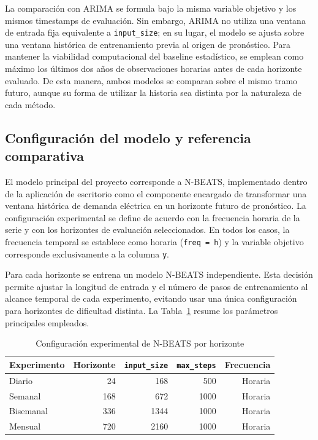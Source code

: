 La comparación con ARIMA se formula bajo la misma variable objetivo y los mismos timestamps de evaluación. Sin embargo, ARIMA no utiliza una ventana de entrada fija equivalente a \texttt{input\_size}; en su lugar, el modelo se ajusta sobre una ventana histórica de entrenamiento previa al origen de pronóstico. Para mantener la viabilidad computacional del baseline estadístico, se emplean como máximo los últimos dos años de observaciones horarias antes de cada horizonte evaluado. De esta manera, ambos modelos se comparan sobre el mismo tramo futuro, aunque su forma de utilizar la historia sea distinta por la naturaleza de cada método.

\subsection{Configuración del modelo y referencia comparativa}

El modelo principal del proyecto corresponde a N-BEATS, implementado dentro de la aplicación de escritorio como el componente encargado de transformar una ventana histórica de demanda eléctrica en un horizonte futuro de pronóstico. La configuración experimental se define de acuerdo con la frecuencia horaria de la serie y con los horizontes de evaluación seleccionados. En todos los casos, la frecuencia temporal se establece como horaria (\texttt{freq = h}) y la variable objetivo corresponde exclusivamente a la columna \texttt{y}.

Para cada horizonte se entrena un modelo N-BEATS independiente. Esta decisión permite ajustar la longitud de entrada y el número de pasos de entrenamiento al alcance temporal de cada experimento, evitando usar una única configuración para horizontes de dificultad distinta. La Tabla~\ref{tab:configuracion-nbeats} resume los parámetros principales empleados.

\begin{table}[htbp]
    \centering
    \caption{Configuración experimental de N-BEATS por horizonte}
    \label{tab:configuracion-nbeats}
    \begin{tabular}{lrrrr}
        \toprule
        Experimento & Horizonte & \texttt{input\_size} & \texttt{max\_steps} & Frecuencia \\
        \midrule
        Diario      & 24        & 168                  & 500                 & Horaria    \\
        Semanal     & 168       & 672                  & 1000                & Horaria    \\
        Bisemanal   & 336       & 1344                 & 1000                & Horaria    \\
        Mensual     & 720       & 2160                 & 1000                & Horaria    \\
        \bottomrule
    \end{tabular}
\end{table}

